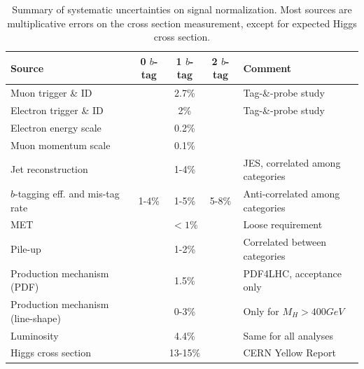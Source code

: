 \begin{table}[hb]
\caption{
Summary of systematic uncertainties on signal normalization. Most sources are multiplicative errors
on the cross section measurement, except for expected Higgs cross section.
}
\label{table-systematics}
\begin{center}
\footnotesize
\begin{tabular}{|l|c|c|c|p{5cm}|}
\hline
Source      &   0 $b$-tag   &   1 $b$-tag  &   2 $b$-tag  &   Comment \\ \hline \hline
Muon trigger \& ID               &  \multicolumn{3}{c|}{2.7\%}       & Tag-\&-probe study \\
Electron trigger \& ID           &  \multicolumn{3}{c|}{2\%}         & Tag-\&-probe study  \\ \hline
Electron energy scale            &  \multicolumn{3}{c|}{0.2\%}       & \\
Muon momentum scale              &  \multicolumn{3}{c|}{0.1\%}       & \\ \hline
Jet reconstruction               &  \multicolumn{3}{c|}{1-4\%}       & JES, correlated among categories \\ \hline
$b$-tagging eff. and mis-tag rate &  1-4\% & 1-5\% & 5-8\%            & Anti-correlated among categories \\ \hline
MET                              &  \multicolumn{3}{c|}{$<1$\%}      & Loose requirement \\ \hline
Pile-up                          &  \multicolumn{3}{c|}{1-2\%}       & Correlated between categories \\
Production mechanism (PDF)       &  \multicolumn{3}{c|}{1.5\%}       & PDF4LHC, acceptance only\\
Production mechanism (line-shape) &  \multicolumn{3}{c|}{0-3\%}       & Only for $M_H>400 GeV$  \\
Luminosity                       &  \multicolumn{3}{c|}{4.4$\%$}     & Same for all analyses \\
Higgs cross section              &  \multicolumn{3}{c|}{13-15$\%$ }  & CERN Yellow Report   \\
\hline
\end{tabular}
\end{center}
\end{table}

